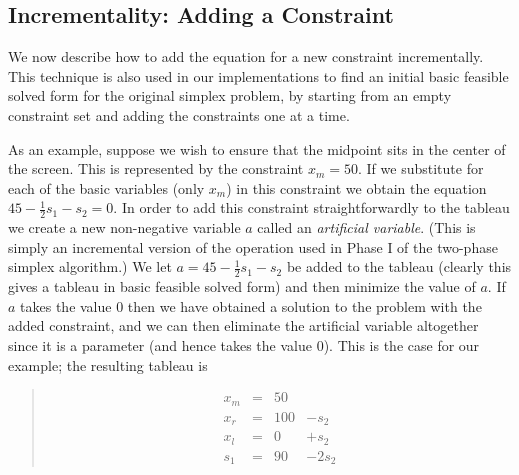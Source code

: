 \documentclass{article}
\newcommand{\ignore}[1]{}
\begin{document}
\ignore{ %
\begin{quote}\vspace*{-1ex}
\textbf{Simplex algorithm} 
\\ {\sc input:} An  optimization problem $(C_S \wedge C_P,f)$ 
in basic feasible solved form.
\\ {\sc output:} Either  $false$ indicating that $(C_S \wedge C_P,f)$
does not have an optimal solution or else an optimal solution
to  $(C_S \wedge C_P,f)$.
\\ {\sc method:} 
Call , and let $\tuple{ F, C', f'}$ be the result.
If $F$ is $false$, output $false$, otherwise output the basic feasible
solution corresponding to $(C',f')$.
\end{quote}\vspace{-0.9ex}
} %

\subsection{Incrementality: Adding a Constraint}
\label{adding-constraints}

We now describe how to add the equation for a new constraint incrementally.
This technique is also used in our implementations to find an initial basic
feasible solved form for the original simplex problem, by starting from an
empty constraint set and adding the constraints one at a time.

As an example, suppose we wish to ensure that the midpoint
sits in the center of the screen.  
This is represented by the constraint
$x_m = 50$.  If we substitute for each of the basic variables
(only $x_m$) in this constraint we obtain the equation
$45 - \frac{1}{2} s_1 - s_2 = 0$.  
In order to add this constraint
straightforwardly to the tableau we create a new 
non-negative variable $a$ called an \emph{artificial variable}.
(This is simply an incremental version of the operation used in
Phase I of the two-phase simplex algorithm.)
We let $a = 45 - \frac{1}{2} s_1 - s_2$ be added to the tableau
(clearly this gives a tableau in basic feasible solved form)
and then minimize the value of $a$.
If $a$ takes the value $0$
then we have obtained a solution to the problem
with the added constraint, and
we can then eliminate the artificial variable altogether since it is 
a parameter (and hence takes the value 0).  This is the case for our example;
the resulting tableau is
\begin{quote}\vspace*{-1ex}
$$
\begin{array}{rlrrr} 
x_m & = &50   \\
x_r & = &100 & - s_2 \\ \hline
x_l & = &0 & + s_2 \\
s_1 & = &90 & -2 s_2
\end{array}
$$
\end{quote}\vspace{-0.9ex}
\end{document}

